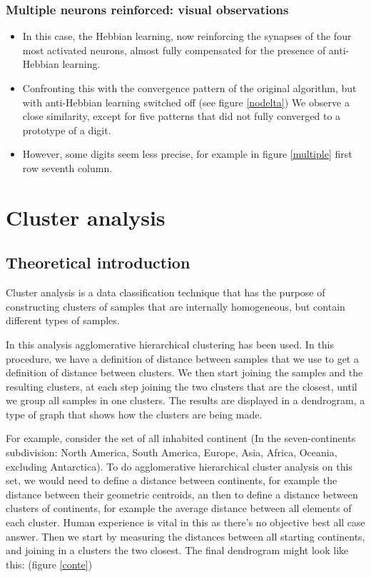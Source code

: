 \documentclass[a4paper]{report}
\begin{document}
\subsection{Multiple neurons reinforced: visual observations}

\begin{itemize}
    \item In this case, the Hebbian learning, now reinforcing the synapses of the four most activated neurons, almost fully compensated for the presence of anti-Hebbian learning. 
    \item Confronting this with the convergence pattern of the original algorithm, but with anti-Hebbian learning switched off  (see figure \ref{nodelta}) We observe a close similarity, except for five patterns that did not fully converged to a prototype of a digit.
    \item However, some digits seem less precise, for example in figure \ref{multiple} first row seventh column.
\end{itemize}

\chapter{Cluster analysis}

\section{Theoretical introduction}

Cluster analysis is a data classification technique that has the purpose of constructing clusters of samples that are internally homogeneous, but contain different types of samples.

In this analysis agglomerative hierarchical clustering has been used.
In this procedure, we have a definition of distance between samples that we use to get a definition of distance between clusters.
We then start joining the samples and the resulting clusters, at each step joining the two clusters that are the closest, until we group all samples in one clusters.
The results are displayed in a dendrogram, a type of graph that shows how the clusters are being made.

For example, consider the set of all inhabited continent (In the seven-continents subdivision:
North America, South America, Europe, Asia, Africa, Oceania, excluding Antarctica).
To do agglomerative hierarchical cluster analysis on this set, we would need to define a distance between continents, for example the distance between their geometric centroids, an then to define a distance between clusters of continents, for example the average distance between all elements of each cluster.
Human experience is vital in this as there's no objective best all case answer.
Then we start by measuring the distances between all starting continents, and joining in a clusters the two closest.
The final dendrogram might look like this:
(figure \ref{conte})
\end{document}
